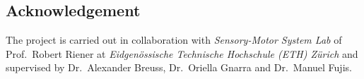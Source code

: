 \subsection*{Acknowledgement}
The project is carried out in collaboration with \textit{Sensory-Motor System Lab} of Prof.~Robert Riener at \textit{Eidgenössische Technische Hochschule 
(ETH) Zürich} and supervised by Dr.~Alexander Breuss, Dr.~Oriella Gnarra and Dr.~Manuel Fujis.

